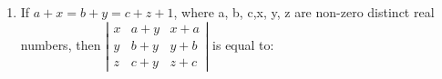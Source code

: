\documentclass[journal,12pt,onecolumn]{IEEEtran}
\theoremstyle{remark}
\begin{document}
\begin{enumerate}
      \begin{enumerate}
      \end{enumerate}
     \item If $a+x=b+y=c+z+1$, where a, b, c,x, y, z are non-zero distinct real numbers, then  
    $ \left| \begin{matrix} x & a+y & x+a \\ y & b+y & y+b \\z & c+y & z+c  \end{matrix} \right|$ is equal to:
     \begin{enumerate}
      \end{enumerate}

      
 \end{enumerate}
 
\end{document}
